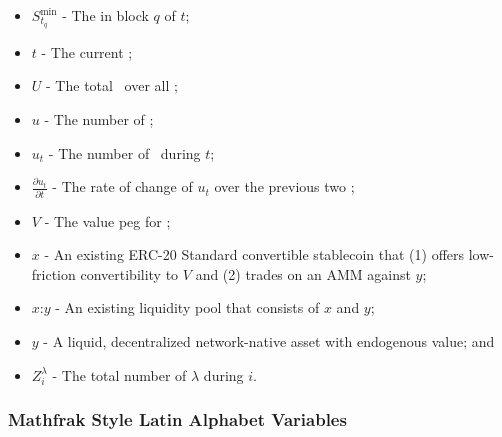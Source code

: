 \documentclass[class=article, crop=false]{standalone}
\begin{document}
\begin{itemize}[topsep=0pt, itemsep=3pt,leftmargin=16pt]
    \item[] $S_{t_q}^{\text{min}}$ - The  in block $q$ of $t$;
    \item[] $t$ - \hypertarget{ht204}{The current };
    \item[] $U$ - \hypertarget{ht207}{The total  \Bean\ over all };
    \item[] $u$ - \hypertarget{ht208}{The number of  \Bean};
    \item[] $u_t$ - The number of  \Bean\ during $t$;
    \item[] $\frac{\partial u_t}{\partial t}$ - The rate of change of $u_t$ over the previous two ;
    \item[] $V$ - \hypertarget{ht216}{The value peg for };
    \item[] $x$ - \hypertarget{ht223}{An existing ERC-20 Standard convertible stablecoin that (1) offers low-friction convertibility to $V$ and (2) trades on an AMM against $y$};
    \item[] $x$:$y$ - \hypertarget{ht224}{An existing liquidity pool that consists of $x$ and $y$};
    \item[] $y$ - \hypertarget{ht227}{A liquid, decentralized network-native asset with endogenous value}; and
    \item[] $Z_i^{\lambda}$ - \hypertarget{ht231}{The total number of $\lambda$  during  $i$}.
\end{itemize}

\subsubsection{Mathfrak Style Latin Alphabet Variables}
\end{document}
